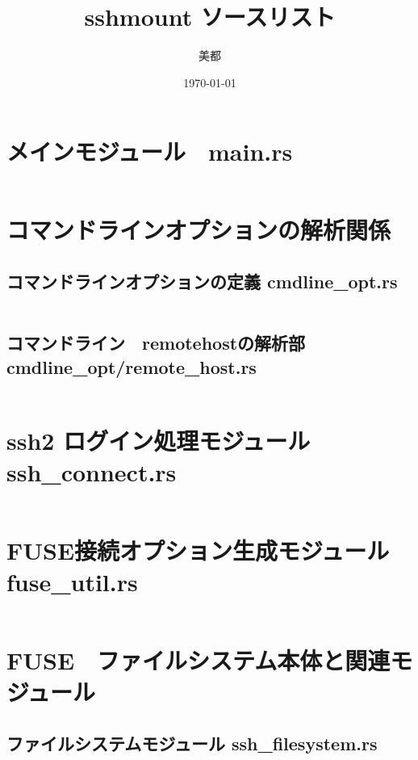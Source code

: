 \documentclass[paper=a4paper, fontsize=10pt, head_space=10mm, foot_space=17mm, gutter=17mm, line_length=185mm, twoside]{jlreq}
\title{sshmount ソースリスト}
\author{美都}
\date{\today}
\begin{document}
\maketitle
\tableofcontents
\clearpage

\section{メインモジュール　main.rs}
\inputminted[linenos, breaklines]{rust}{src/main.rs}
\clearpage

\section{コマンドラインオプションの解析関係}
\subsection{コマンドラインオプションの定義 cmdline\_opt.rs}
\inputminted[linenos, breaklines]{rust}{src/cmdline_opt.rs}
\clearpage

\subsection{コマンドライン　remotehostの解析部 cmdline\_opt/remote\_host.rs}
\inputminted[linenos, breaklines]{rust}{src/cmdline_opt/remote_host.rs}
\clearpage

\section{ssh2 ログイン処理モジュール ssh\_connect.rs}
\inputminted[linenos, breaklines]{rust}{src/ssh_connect.rs}
\clearpage

\section{FUSE接続オプション生成モジュール fuse\_util.rs}
\inputminted[linenos, breaklines]{rust}{src/fuse_util.rs}
\clearpage

\section{FUSE　ファイルシステム本体と関連モジュール}
\subsection{ファイルシステムモジュール ssh\_filesystem.rs}
\inputminted[linenos, breaklines]{rust}{src/ssh_filesystem.rs}
\clearpage
\end{document}
